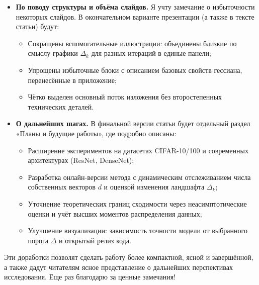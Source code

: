 \documentclass[11pt]{article}
\begin{document}
\begin{itemize}
    \item \textbf{По поводу структуры и объёма слайдов.}
          Я учту замечание о избыточности некоторых слайдов. В окончательном варианте презентации (а также в тексте статьи) будут:
          \begin{itemize}
              \item Сокращены вспомогательные иллюстрации: объединены близкие по смыслу графики $\Delta_k$ для разных итераций в единые панели;
              \item Упрощены избыточные блоки с описанием базовых свойств гессиана, перенесённые в приложение;
              \item Чётко выделен основный поток изложения без второстепенных технических деталей.
          \end{itemize}

    \item \textbf{О дальнейших шагах.}
          В финальной версии статьи будет отдельный раздел «Планы и будущие работы», где подробно описаны:
          \begin{itemize}
              \item Расширение экспериментов на датасетах CIFAR-10/100 и современных архитектурах (ResNet, DenseNet);
              \item Разработка онлайн-версии метода с динамическим отслеживанием числа собственных векторов $d$ и оценкой изменения ландшафта $\Delta_k$;
              \item Уточнение теоретических границ сходимости через неасимптотические оценки и учёт высших моментов распределения данных;
              \item Улучшение визуализации: зависимость точности модели от выбранного порога $\Delta$ и открытый релиз кода.
          \end{itemize}
\end{itemize}

Эти доработки позволят сделать работу более компактной, ясной и завершённой, а также дадут читателям ясное представление о дальнейших перспективах исследования. Еще раз благодарю за ценные замечания!
\end{document}

